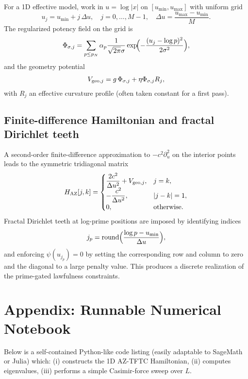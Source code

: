 \documentclass[11pt]{article}
\begin{document}
For a 1D effective model, work in $u=\log|x|$ on $[u_{\min},u_{\max}]$ with uniform grid
\begin{equation}
u_j = u_{\min} + j\,\Delta u,\quad j=0,\dots,M-1,\quad
\Delta u = \frac{u_{\max}-u_{\min}}{M}.
\end{equation}
The regularized potency field on the grid is
\begin{equation}
\Phi_{\sigma,j}
  = \sum_{p\le p_N}\alpha_p \frac{1}{\sqrt{2\pi}\sigma}
     \exp\!\Bigl(-\frac{(u_j-\log p)^2}{2\sigma^2}\Bigr),
\end{equation}
and the geometry potential
\begin{equation}
V_{{\rm geo},j} = g\,\Phi_{\sigma,j} + \eta \Phi_{\sigma,j} R_j,
\end{equation}
with $R_j$ an effective curvature profile (often taken constant for a first pass).

\subsection{Finite-difference Hamiltonian and fractal Dirichlet teeth}

A second-order finite-difference approximation to $-c^2\partial_u^2$ on the interior points leads to the symmetric tridiagonal matrix
\begin{equation}
H_{\rm AZ}[j,k] =
\begin{cases}
\displaystyle \frac{2 c^2}{\Delta u^2} + V_{{\rm geo},j}, & j = k, \\
\displaystyle -\frac{c^2}{\Delta u^2}, & |j-k| = 1,\\
0, & \text{otherwise}.
\end{cases}
\end{equation}
Fractal Dirichlet teeth at log-prime positions are imposed by identifying indices
\begin{equation}
j_p = \text{round}\Bigl(\frac{\log p - u_{\min}}{\Delta u}\Bigr),
\end{equation}
and enforcing $\psi(u_{j_p})=0$ by setting the corresponding row and column to zero and the diagonal to a large penalty value.
This produces a discrete realization of the prime-gated lawfulness constraints.

\appendix

\section{Appendix: Runnable Numerical Notebook}

Below is a self-contained Python-like code listing (easily adaptable to SageMath or Julia) which:
(i) constructs the 1D AZ-TFTC Hamiltonian,
(ii) computes eigenvalues,
(iii) performs a simple Casimir-force sweep over $L$.
\end{document}
